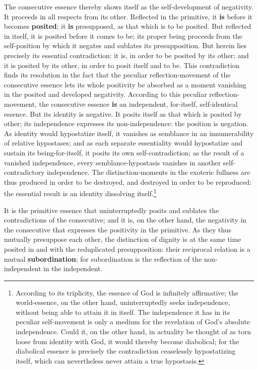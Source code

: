 \documentclass[12pt,a4paper,openany]{book}
\newcommand{\opage}[1]{\marginnote{\footnotesize\textit{[#1]}}}
\begin{document}
The consecutive essence thereby shows itself as
the self-development of negativity. It proceeds in
all respects from its other. Reflected in the
primitive, it \textbf{is} before it becomes \textbf{posited}; it \textbf{is} presupposed,
as that which is to be posited. But reflected in
itself, it is posited before it comes to be;
its proper being proceeds from the self-position
by which it negates and sublates its presupposition.
But herein lies precisely its essential
contradiction: it is, in order to be posited by its other;
and it is posited by its other, in order to posit itself
and to be. This contradiction finds its resolution
in the fact that the peculiar reflection-movement
of the consecutive essence lets its whole positivity
be absorbed as a moment vanishing in the posited and developed negativity.
According to this peculiar
reflection-movement, the consecutive
\setcounter{footnote}{0}%
\opage{122}essence \textbf{is} an independent, for-itself, self-identical
essence. But its identity is negative.
It posits itself as that which is posited by other;
its independence expresses its non-independence:
the position is negation. As identity
would hypostatize itself, it vanishes as semblance in an
innumerability of relative hypostases; and as each
separate essentiality would hypostatize and sustain its
being-for-itself, it posits its own self-contradiction;
as the result of a vanished independence, every
semblance-hypostasis vanishes in another self-contradictory independence. The distinction-moments in the
exoteric fullness are thus produced in order to be destroyed,
and destroyed in order to be reproduced: the essential
result is an identity dissolving itself.\footnote{According to its triplicity, the essence of God is infinitely affirmative; the world-essence, on the other hand, uninterruptedly seeks independence, without being able to attain it in itself. The independence it has in its peculiar self-movement is only a medium for the revelation of God's absolute independence. Could it, on the other hand, in actuality be thought of as torn loose from identity with God, it would thereby become diabolical; for the diabolical essence is precisely the contradiction ceaselessly hypostatizing itself, which can nevertheless never attain a true hypostasis.}

It is the primitive essence that uninterruptedly posits
and sublates the contradictions of the consecutive; and
it is, on the other hand, the negativity in the
consecutive that expresses the positivity in the primitive.
As they thus mutually presuppose each other,
the distinction of dignity is at the same time posited in and with
the reduplicated presupposition: their reciprocal
\setcounter{footnote}{0}%
\opage{123}relation is a mutual \textbf{subordination}; for
subordination is the reflection of the non-independent in
the independent.
\end{document}

